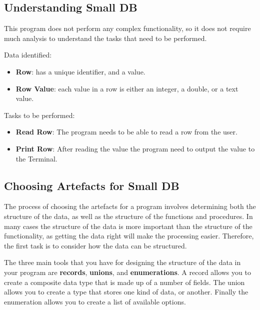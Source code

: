 
\subsection{Understanding Small DB} %
\label{sub:understanding_small_db}

This program does not perform any complex functionality, so it does not require much analysis to understand the tasks that need to be performed.

Data identified:
\begin{itemize}
  \item \textbf{Row}: has a unique identifier, and a value.
  \item \textbf{Row Value}: each value in a row is either an integer, a double, or a text value.
\end{itemize}

Tasks to be performed:
\begin{itemize}
  \item \textbf{Read Row}: The program needs to be able to read a row from the user.
  \item \textbf{Print Row}: After reading the value the program need to output the value to the Terminal.
\end{itemize}

\clearpage
\subsection{Choosing Artefacts for Small DB} %
\label{sub:choosing_artefacts_for_small_db}

The process of choosing the artefacts for a program involves determining both the structure of the data, as well as the structure of the functions and procedures. In many cases the structure of the data is more important than the structure of the functionality, as getting the data right will make the processing easier. Therefore, the first task is to consider how the data can be structured.

The three main tools that you have for designing the structure of the data in your program are \textbf{records}, \textbf{unions}, and \textbf{enumerations}. A record allows you to create a composite data type that is made up of a number of fields. The union allows you to create a type that stores one kind of data, or another. Finally the enumeration allows you to create a list of available options.

